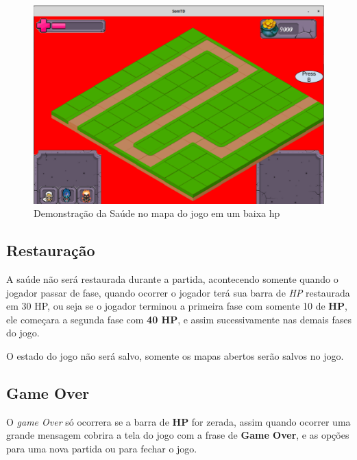 \documentclass[11pt]{article} %
\begin{document}
\begin{figure}[!htp]
\centering
\includegraphics[scale=0.3]{res/danger.png}
\caption{Demonstração da Saúde no mapa do jogo em um baixa hp}
\label{Saúde}
\end{figure}

\subsection{Restauração}
A saúde não será restaurada durante a partida, acontecendo somente quando o jogador passar de fase, quando ocorrer o jogador terá sua barra de \textit{HP} restaurada em 30 HP, ou seja se o jogador terminou a primeira fase com somente 10 de \textbf{HP}, ele começara a segunda fase com \textbf{40 HP}, e assim sucessivamente nas demais fases do jogo.  

O estado do jogo não será salvo, somente os mapas abertos serão salvos no jogo.

\subsection{Game Over}
O \textit{game Over} só ocorrera se a barra de \textbf{HP} for zerada, assim quando ocorrer uma grande mensagem cobrira a tela do jogo com a frase de \textbf{Game Over}, e as opções para uma nova partida ou para fechar o jogo.
\end{document}
